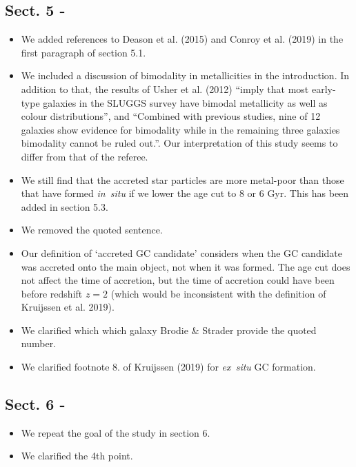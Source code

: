 \documentclass{article}
\begin{document}
\subsection*{Sect. 5 -}
\begin{itemize}
\item We added references to Deason et al. (2015) and Conroy et al. (2019) in
the first paragraph of section 5.1.
\item We included a discussion of bimodality in metallicities in the introduction.
In addition to that, the results of Usher et al. (2012) ``imply that most early-type 
galaxies in the SLUGGS survey have bimodal metallicity as well as colour distributions'',
and ``Combined with previous studies, nine of 12 galaxies show evidence for bimodality
while in the remaining three galaxies bimodality cannot be ruled out.''. Our 
interpretation of this study seems to differ from that of the referee.
\item We still find that the accreted star particles are more metal-poor than 
those that have formed {\it in~situ} if we lower the age cut to 8 or 6 Gyr.
This has been added in section 5.3.
\item We removed the quoted sentence.
\item Our definition of `accreted GC candidate' considers when the GC candidate 
was accreted onto the main object, not when it was formed. The age cut does not
affect the time of accretion, but the time of accretion could have been before redshift
$z=2$ (which would be inconsistent with the definition of Kruijssen et al. 2019).
\item We clarified which which galaxy Brodie \& Strader provide the quoted number.
\item We clarified footnote 8.
of Kruijssen (2019) for {\it ex~situ} GC formation.
\end{itemize}

\subsection*{Sect. 6 -}
\begin{itemize}
\item We repeat the goal of the study in section 6.
\item We clarified the 4th point.
\end{itemize}
\end{document}
